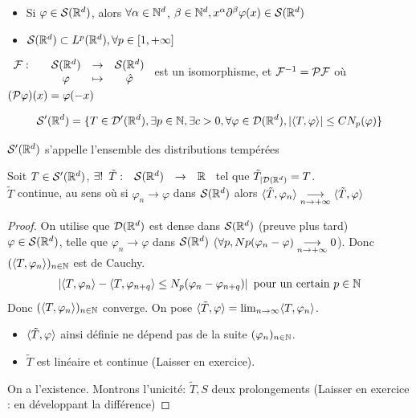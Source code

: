 \documentclass[]{report}
\begin{document}
    \begin{re}{}{}
        \begin{itemize}
            \item Si $\varphi\in \mathcal{S}(\mathbb{R}^d)$, alors $\forall \alpha \in \mathbb{N}^d$, $\beta\in \mathbb{N}^d,x^\alpha\partial^\beta \varphi(x)\in \mathcal{S}(\mathbb{R}^d)$
            \item $\mathcal{S}(\mathbb{R}^d)\subset L^p(\mathbb{R}^d),\forall p\in [1,+\infty]$
        \end{itemize}
    \end{re}

    \begin{prop}{}{}
        $\begin{array}{ccccc} \mathcal{F} : & & \mathcal{S}(\mathbb{R}^d) & \to & \mathcal{S}(\mathbb{R}^d) \\ & & \varphi & \mapsto & \hat{\varphi} \end{array}$ est un isomorphisme, et $\mathcal{F}^{-1}=\mathcal{P}\mathcal{F}$ où $(\mathcal{P} \varphi)(x)=\varphi(-x)$
    \end{prop}

    \begin{df}{}{}
        \[\mathcal{S}'(\mathbb{R}^d)=\{T\in \mathcal{D}'(\mathbb{R}^d),\exists p\in \mathbb{N},\exists c>0,\forall \varphi\in \mathcal{D}(\mathbb{R}^d),|\langle T,\varphi \rangle|\le C N_p(\varphi)\}\]
    \end{df}

    \begin{nt}{}{}
        $\mathcal{S}'(\mathbb{R}^d)$ s'appelle l'ensemble des distributions tempérées
    \end{nt}

    \begin{prop}{}{}
        Soit $T\in \mathcal{S}'(\mathbb{R}^d)$, $\exists! \begin{array}{ccccc} \tilde{T} : & \mathcal{S}(\mathbb{R}^d) & \to & \mathbb{R} \end{array}$ tel que $\tilde{T}_{|\mathcal{D}(\mathbb{R}^d)}=T$.\\
        $\tilde{T}$ continue, au sens où si $\varphi_n\to \varphi$ dans $\mathcal{S}(\mathbb{R}^d)$ alors $\langle \tilde{T},\varphi_n \rangle\underset{n\to +\infty}{\longrightarrow}\langle \tilde{T},\varphi \rangle$
    \end{prop}

    \begin{proof}
        On utilise que $\mathcal{D}(\mathbb{R}^d)$ est dense dans $\mathcal{S}(\mathbb{R}^d)$ (preuve plus tard)\\
        $\varphi\in \mathcal{S}(\mathbb{R}^d)$, telle que $\varphi_n\to \varphi$ dans $\mathcal{S}(\mathbb{R}^d)$ ($\forall p,Np(\varphi_n-\varphi)\underset{n\to +\infty}{\longrightarrow} 0$). Donc $(\langle T,\varphi_n \rangle)_{n\in\mathbb{N}}$ est de Cauchy.\\
        \begin{align*}
            \left|\langle T,\varphi_n \rangle-\langle T,\varphi_{n+q} \rangle\le N_p(\varphi_n-\varphi_{n+q})\right|\text{ pour un certain $p\in \mathbb{N}$}
        \end{align*} 
        Donc $(\langle T,\varphi_n \rangle)_{n\in\mathbb{N}}$ converge. On pose $\langle \tilde{T},\varphi \rangle=\lim_{n\to \infty}\langle T,\varphi_{n} \rangle$.
        \begin{itemize}
            \item $\langle \tilde{T},\varphi \rangle$ ainsi définie ne dépend pas de la suite $(\varphi_n)_{n\in\mathbb{N}}$.
            \item $\tilde{T}$ est linéaire et continue (Laisser en exercice).
        \end{itemize}
        On a l'existence. Montrons l'unicité: $\tilde{T},S$ deux prolongements (Laisser en exercice : en développant la différence)
    \end{proof}
\end{document}
